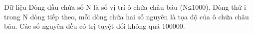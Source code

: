 Dữ liệu
Dòng đầu chứa số N là số vị trí ô chứa châu báu (N≤1000). Dòng thứ i trong N dòng tiếp theo, mỗi dòng chứa hai số nguyên là tọa độ của ô chứa châu báu. Các số nguyên đều có trị tuyệt đối không quá 100000.